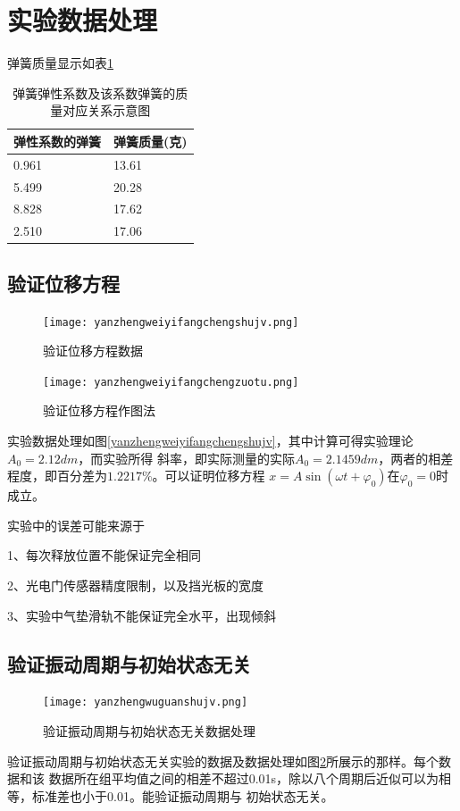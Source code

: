 \documentclass{ctexart}
\begin{document}
\section{实验数据处理}
弹簧质量显示如表\ref{tanhuangzhiliang}
\begin{table}[h]
  \centering   
  \caption{弹簧弹性系数及该系数弹簧的质量对应关系示意图}\label{tanhuangzhiliang}
  \begin{tabular}{| l || l |}
      \hline
      弹性系数的弹簧 & 弹簧质量(克)\\
      \hline
      0.961 & 13.61 \\
      \hline
      5.499 & 20.28 \\
      \hline
      8.828 & 17.62 \\
      \hline
      2.510 & 17.06 \\
      \hline                       
  \end{tabular}
\end{table}
  \subsection{验证位移方程}
  \begin{figure}[b]
    \centering
    \begin{minipage}[b]{0.48\textwidth}
      \centering
      \texttt{[image: yanzhengweiyifangchengshujv.png]}
      \caption{验证位移方程数据}\label{yanzhengweiyifangchengshujv}
    \end{minipage}
    \begin{minipage}[b]{0.48\textwidth}
      \centering
      \texttt{[image: yanzhengweiyifangchengzuotu.png]}
      \caption{验证位移方程作图法}\label{yanzhengweiyifangchengzuotu}
    \end{minipage}
  \end{figure}

  实验数据处理如图\ref{yanzhengweiyifangchengshujv}，其中计算可得实验理论$A_{0}=2.12dm$，而实验所得
  斜率，即实际测量的实际$A_{0}=2.1459dm$，两者的相差程度，即百分差为$1.2217\%$。可以证明位移方程
  $x=A\sin \left( \omega t + {\varphi}_{0} \right) \mbox{在}{\varphi}_{0} = 0 $时成立。

  实验中的误差可能来源于

  1、每次释放位置不能保证完全相同

  2、光电门传感器精度限制，以及挡光板的宽度

  3、实验中气垫滑轨不能保证完全水平，出现倾斜

  \subsection{验证振动周期与初始状态无关}
  \begin{figure}[t]
    \centering
    \texttt{[image: yanzhengwuguanshujv.png]}
    \caption{验证振动周期与初始状态无关数据处理}\label{yanzhengwuguanshujv}
  \end{figure}
  验证振动周期与初始状态无关实验的数据及数据处理如图\ref{yanzhengwuguanshujv}所展示的那样。每个数据和该
  数据所在组平均值之间的相差不超过0.01s，除以八个周期后近似可以为相等，标准差也小于0.01。能验证振动周期与
  初始状态无关。
\end{document}
